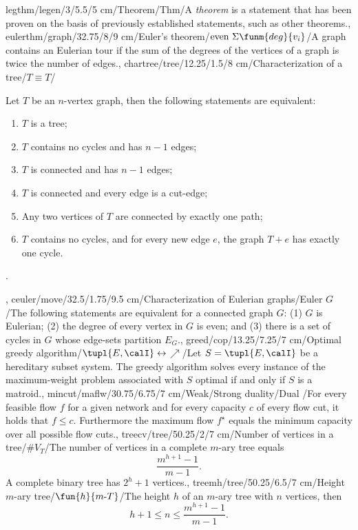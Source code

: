 legthm/legen/3/5.5/5 cm/Theorem/Thm/{A \emph{theorem} is a statement that has been proven on the basis of previously established statements, such as other theorems.},
eulerthm/graph/32.75/8/9 cm/{Euler's theorem}/$\mbox{even}\ \Sigma{\funm{deg}{v_i}}$/{A graph contains an Eulerian tour if the sum of the degrees of the vertices of a graph is twice the number of edges.},
chartree/tree/12.25/1.5/8 cm/{Characterization of a tree}/{$T\equiv T$}/{Let $T$ be an $n$-vertex graph, then the following statements are equivalent:\begin{enumerate}\item $T$ is a tree; \item $T$ contains no cycles and has $n-1$ edges; \item $T$ is connected and has $n-1$ edges; \item $T$ is connected and every edge is a cut-edge; \item Any two vertices of $T$ are connected by exactly one path; \item $T$ contains no cycles, and for every new edge $e$, the graph $T+e$ has exactly one cycle.\end{enumerate}.},
ceuler/move/32.5/1.75/9.5 cm/{Characterization of Eulerian graphs}/{Euler $G$}/{The following statements are equivalent for a connected graph $G$: (1) $G$ is Eulerian; (2) the degree of every vertex in $G$ is even; and (3) there is a set of cycles in $G$ whose edge-sets partition $E_G$.},
greed/cop/13.25/7.25/7 cm/{Optimal greedy algorithm}/{$\tupl{E,\calI}\leftrightarrow$\textdollaroldstyle$\nearrow$}/{Let $S=\tupl{E,\calI}$ be a hereditary subset system. The greedy algorithm solves every instance of the maximum-weight problem associated with $S$ optimal if and only if $S$ is a matroid.},
mincut/maflw/30.75/6.75/7 cm/{Weak/Strong duality}/{Dual \watertap}/{For every feasible flow $f$ for a given network and for every capacity $c$ of every flow cut, it holds that $f\leq c$. Furthermore the maximum flow $f^{\star}$ equals the minimum capacity over all possible flow cuts.},
treecv/tree/50.25/2/7 cm/{Number of vertices in a tree}/{$\#V_T$}/{The number of vertices in a complete $m$-ary tree equals\[\dfrac{m^{h+1}-1}{m-1}.\] A complete binary tree has $2^h+1$ vertices.},
treemh/tree/50.25/6.5/7 cm/{Height $m$-ary tree}/{$\fun{h}{m\mbox{-}T}$}/{The height $h$ of an $m$-ary tree with $n$ vertices, then \[h+1\leq n\leq\dfrac{m^{h+1}-1}{m-1}.\]}